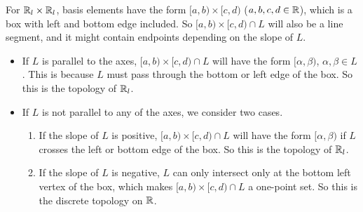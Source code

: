\documentclass[a4paper,11pt]{article}
\begin{document}
\begin{minipage}[t][270mm]{90mm}
    For \(\mathbb{R}_l \times \mathbb{R}_l\), basis elements have the form \([a, b) \times [c, d)\) (\(a, b, c, d \in \mathbb{R}\)), which is a box with left and bottom edge included. So \([a, b) \times [c, d) \cap L\) will also be a line segment, and it might contain endpoints depending on the slope of \(L\).
    \begin{itemize}
        \item If \(L\) is parallel to the axes, \([a, b) \times [c, d) \cap L\) will have the form \([\alpha, \beta)\), \(\alpha, \beta \in L\). This is because \(L\) must pass through the bottom or left edge of the box. So this is the topology of \(\mathbb{R}_l\).
        \item If \(L\) is not parallel to any of the axes, we consider two cases.
        \begin{enumerate}
            \item If the slope of \(L\) is positive, \([a, b) \times [c, d) \cap L\) will have the form \([\alpha, \beta)\) if \(L\) crosses the left or bottom edge of the box. So this is the topology of \(\mathbb{R}_l\).
            \item If the slope of \(L\) is negative, \(L\) can only intersect only at the bottom left vertex of the box, which makes \([a, b) \times [c, d) \cap L\) a one-point set. So this is the discrete topology on \(\mathbb{R}\).
        \end{enumerate}
    \end{itemize}
\end{minipage}
{\color{gray}\vline}
\begin{minipage}[t][270mm]{90mm}
    \phantom{?}
\end{minipage}

\newpage

\phantom{?}
\vspace{5mm}
\end{document}
